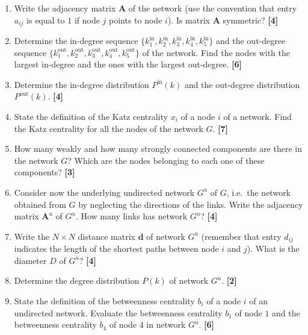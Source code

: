 \documentclass[11pt,a4paper]{article}
\begin{document}
\begin{enumerate}[label=\textbf{\alph*)}, leftmargin=*, itemsep=1em]

\item
Write the adjacency matrix $\mathbf{A}$ of the network (use the convention that entry $a_{ij}$ is equal to $1$ if node $j$ points to node $i$). Is matrix $\mathbf{A}$ symmetric?
\textbf{[4]}

\item
Determine the in-degree sequence $\{k_1^{\mathrm{in}}, k_2^{\mathrm{in}}, k_3^{\mathrm{in}}, k_4^{\mathrm{in}}, k_5^{\mathrm{in}}\}$ and the out-degree sequence $\{k_1^{\mathrm{out}}, k_2^{\mathrm{out}}, k_3^{\mathrm{out}}, k_4^{\mathrm{out}}, k_5^{\mathrm{out}}\}$ of the network. Find the nodes with the largest in-degree and the ones with the largest out-degree.
\textbf{[6]}

\item
Determine the in-degree distribution $P^{\mathrm{in}}(k)$ and the out-degree distribution $P^{\mathrm{out}}(k)$.
\textbf{[4]}

\item
State the definition of the Katz centrality $x_i$ of a node $i$ of a network. Find the Katz centrality for all the nodes of the network $G$.
\textbf{[7]}

\item
How many weakly and how many strongly connected components are there in the network $G$? Which are the nodes belonging to each one of these components?
\textbf{[3]}

\item
Consider now the underlying undirected network $G^{u}$ of $G$, i.e.\ the network obtained from $G$ by neglecting the directions of the links. Write the adjacency matrix $\mathbf{A}^{u}$ of $G^{u}$. How many links has network $G^{u}$?
\textbf{[4]}

\item
Write the $N \times N$ distance matrix $\mathbf{d}$ of network $G^{u}$ (remember that entry $d_{ij}$ indicates the length of the shortest paths between node $i$ and $j$). What is the diameter $D$ of $G^{u}$?
\textbf{[4]}

\item
Determine the degree distribution $P(k)$ of network $G^{u}$.
\textbf{[2]}

\item
State the definition of the betweenness centrality $b_i$ of a node $i$ of an undirected network. Evaluate the betweenness centrality $b_1$ of node $1$ and the betweenness centrality $b_4$ of node $4$ in network $G^{u}$.
\textbf{[6]}

\end{enumerate}
\end{document}
